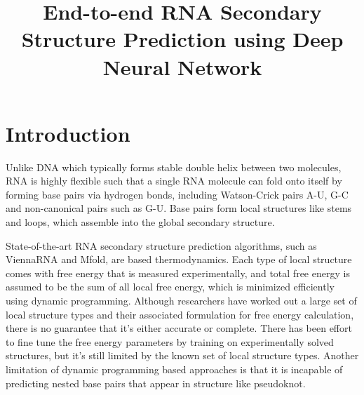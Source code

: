 \documentclass{article}
\title{End-to-end RNA Secondary Structure Prediction using Deep Neural Network}
\begin{document}
\maketitle


\vspace*{-7em}

\section{Introduction}

Unlike DNA which typically forms stable double helix between two molecules, RNA is highly flexible
such that a single RNA molecule can fold onto itself by
forming base pairs via hydrogen bonds, including Watson-Crick pairs A-U,
G-C and non-canonical pairs such as G-U.
Base pairs form local structures like stems and loops,
which assemble into the global secondary structure.

State-of-the-art RNA secondary structure prediction algorithms,
such as ViennaRNA\cite{lorenz2011viennarna} and Mfold\cite{zuker2003mfold},
are based thermodynamics.
Each type of local structure comes with free energy that is measured experimentally,
and total free energy is assumed to be the sum of all local free energy,
which is minimized efficiently using dynamic programming.
Although researchers have worked out a large set of local structure types and
their associated formulation for free energy calculation,
there is no guarantee that it's either accurate or complete.
There has been effort to fine tune the free energy parameters by
training on experimentally solved structures\cite{andronescu2007efficient},
but it's still limited by the known set of local structure types.
Another limitation of dynamic programming based approaches is that
it is incapable of predicting nested base pairs that appear in structure like pseudoknot.


\end{document}
